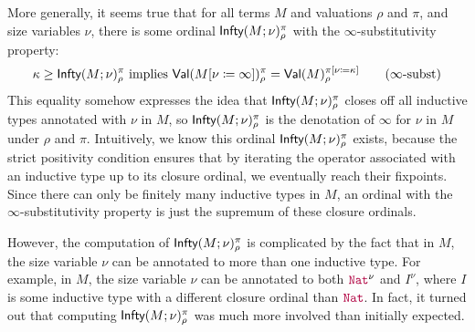 More generally, it seems true that for all terms $M$ and valuations
$\rho$ and $\pi$, and size variables $\nu$, there is some ordinal
$\textsf{Infty}(M;\nu)_\rho^\pi$ with the $\infty$-substitutivity property:
%
\begin{align*}
  \kappa \geq \Infty(M;\nu)_\rho^\pi \text{ implies }
  \Val(\subst{M}{\nu}{\infty})_\rho^\pi = \Val(M)_\rho^{\subst{\pi}{\nu}{\kappa}}
  \label{eqn:infty-subst}\tag{$\infty$-subst}
\end{align*}
%
This equality somehow expresses the idea that $\textsf{Infty}(M;\nu)_\rho^\pi$
closes off all inductive types annotated with $\nu$ in $M$, so
$\textsf{Infty}(M;\nu)_\rho^\pi$ is the denotation of $\infty$ for $\nu$ in
$M$ under $\rho$ and $\pi$.
%
Intuitively, we know this ordinal $\textsf{Infty}(M;\nu)_\rho^\pi$ exists,
because the strict positivity condition ensures that by iterating the
operator associated with an inductive type up to its closure ordinal,
we eventually reach their fixpoints.
%
Since there can only be finitely many inductive types in $M$, an
ordinal with the $\infty$-substitutivity property is just the
supremum of these closure ordinals.

However, the computation of $\textsf{Infty}(M;\nu)_\rho^\pi$ is complicated by
the fact that in $M$, the size variable $\nu$ can be annotated to more
than one inductive type.
%
For example, in $M$, the size variable $\nu$ can be annotated to both
$\Nat^\nu$ and $I^\nu$, where $I$ is some inductive type with a
different closure ordinal than $\Nat$.
%
In fact, it turned out that computing $\textsf{Infty}(M;\nu)_\rho^\pi$ was
much more involved than initially expected.

